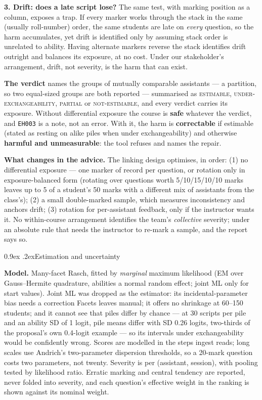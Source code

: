 \documentclass[10pt,a4paper]{article}
\makeatletter
\renewcommand\subsection{\@startsection{subsection}{2}{\z@}{-2.4ex \@plus -.5ex \@minus -.2ex}%
  {0.9ex \@plus .2ex}{\normalfont\large\bfseries}}
\makeatother
\begin{document}
\textbf{3. Drift: does a late script lose?} The same test, with marking position as a column,
exposes a trap. If every marker works through the stack in the same (usually roll-number) order,
the same students are late on \emph{every} question, so the harm accumulates, yet drift is identified
only by assuming stack order is unrelated to ability. Having alternate markers reverse the stack
identifies drift outright and balances its exposure, at no cost. Under our stakeholder's arrangement,
drift, not severity, is the harm that can exist.

\textbf{The verdict} names the groups of mutually comparable assistants --- a partition, so two
equal-sized groups are both reported --- summarised as \textsc{estimable}, \textsc{under-exchangeability},
\textsc{partial} or \textsc{not-estimable}, and every verdict carries its exposure. Without
differential exposure the course is \textbf{safe} whatever the verdict, and \texttt{EH003} is a note,
not an error. With it, the harm is \textbf{correctable} if estimable (stated as resting on alike piles
when under exchangeability) and otherwise \textbf{harmful and unmeasurable}: the tool refuses and
names the repair.

\textbf{What changes in the advice.} The linking design optimises, in order: (1) no differential
exposure --- one marker of record per question, or rotation only in exposure-balanced form
(rotating over questions worth 5/10/15/10/10 marks leaves up to 5 of a student's 50 marks with a
different mix of assistants from the class's); (2) a small double-marked sample, which measures
inconsistency and anchors drift; (3) rotation for per-assistant feedback, only if the instructor
wants it. No within-course arrangement identifies the team's \emph{collective} severity; under an
absolute rule that needs the instructor to re-mark a sample, and the report says so.

\subsection{Estimation and uncertainty}
\label{sec:est}

\textbf{Model.} Many-facet Rasch, fitted by \emph{marginal} maximum likelihood (EM over
Gauss--Hermite quadrature, abilities a normal random effect; joint ML only for start values). Joint
ML was dropped as the estimator: its incidental-parameter bias needs a correction Facets leaves
manual; it offers no shrinkage at 60--150 students; and it cannot see that piles differ by chance ---
at 30 scripts per pile and an ability SD of 1 logit, pile means differ with SD 0.26 logits,
two-thirds of the proposal's own 0.4-logit example --- so its intervals under exchangeability would be
confidently wrong. Scores are modelled in the steps ingest reads; long scales use Andrich's
two-parameter dispersion thresholds, so a 20-mark question costs two parameters, not twenty.
Severity is per (assistant, session), with pooling tested by likelihood ratio. Erratic marking and
central tendency are reported, never folded into severity, and each question's effective weight in
the ranking is shown against its nominal weight.
\end{document}
